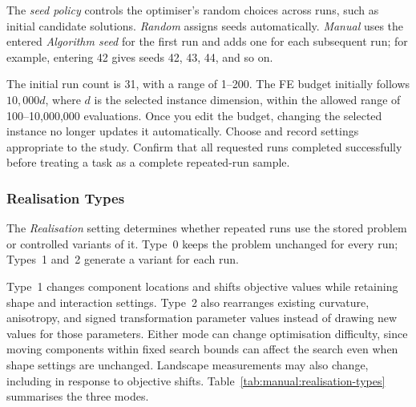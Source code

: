 \documentclass[journal,onecolumn]{IEEEtran}
\begin{document}
The \emph{seed policy} controls the optimiser's random choices across runs, such as initial candidate solutions. \emph{Random} assigns seeds automatically. \emph{Manual} uses the entered \emph{Algorithm seed} for the first run and adds one for each subsequent run; for example, entering 42 gives seeds 42, 43, 44, and so on.

The initial run count is 31, with a range of 1--200. The FE budget initially follows $10{,}000d$, where $d$ is the selected instance dimension, within the allowed range of 100--10,000,000 evaluations. Once you edit the budget, changing the selected instance no longer updates it automatically. Choose and record settings appropriate to the study. Confirm that all requested runs completed successfully before treating a task as a complete repeated-run sample.

\subsubsection{Realisation Types}
\label{sssec:manual:experimental-realisations}

The \emph{Realisation} setting determines whether repeated runs use the stored problem or controlled variants of it. Type~0 keeps the problem unchanged for every run; Types~1 and~2 generate a variant for each run.

Type~1 changes component locations and shifts objective values while retaining shape and interaction settings. Type~2 also rearranges existing curvature, anisotropy, and signed transformation parameter values instead of drawing new values for those parameters. Either mode can change optimisation difficulty, since moving components within fixed search bounds can affect the search even when shape settings are unchanged. Landscape measurements may also change, including in response to objective shifts. Table~\ref{tab:manual:realisation-types} summarises the three modes.
\end{document}
